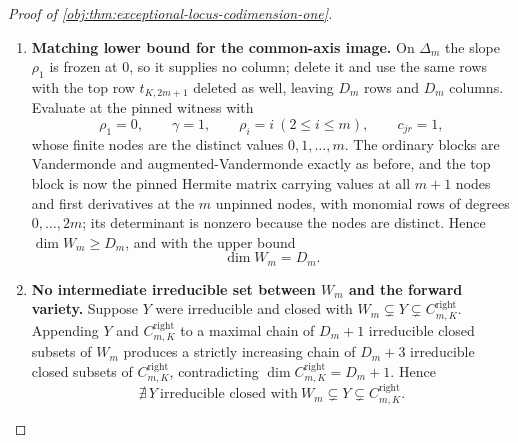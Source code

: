 \begin{proof}[Proof of \cref{obj:thm:exceptional-locus-codimension-one}]
\begin{enumerate}
\begin{itemize}
\end{itemize}
The product of the diagonal determinants is nonzero, so the selected minor is a nonzero polynomial and
\[
\dim C^{\mathrm{right}}_{m,K}\ge D_m+1 .
\]
With the upper bound of the previous step, \(\dim C^{\mathrm{right}}_{m,K}=D_m+1\).

\item \textbf{Matching lower bound for the common-axis image.}  On \(\Delta_m\) the slope \(\rho_1\) is frozen at \(0\), so it supplies no column; delete it and use the same rows with the top row \(t_{K,2m+1}\) deleted as well, leaving \(D_m\) rows and \(D_m\) columns.  Evaluate at the pinned witness with
\[
\rho_1=0,\qquad \gamma=1,\qquad \rho_i=i\ (2\le i\le m),\qquad c_{jr}=1 ,
\]
whose finite nodes are the distinct values \(0,1,\ldots,m\).  The ordinary blocks are Vandermonde and augmented-Vandermonde exactly as before, and the top block is now the pinned Hermite matrix carrying values at all \(m+1\) nodes and first derivatives at the \(m\) unpinned nodes, with monomial rows of degrees \(0,\ldots,2m\); its determinant is nonzero because the nodes are distinct.  Hence \(\dim W_m\ge D_m\), and with the upper bound
\[
\dim W_m=D_m .
\]

\item \textbf{No intermediate irreducible set between \(W_m\) and the forward variety.}  Suppose \(Y\) were irreducible and closed with \(W_m\subsetneq Y\subsetneq C^{\mathrm{right}}_{m,K}\).  Appending \(Y\) and \(C^{\mathrm{right}}_{m,K}\) to a maximal chain of \(D_m+1\) irreducible closed subsets of \(W_m\) produces a strictly increasing chain of \(D_m+3\) irreducible closed subsets of \(C^{\mathrm{right}}_{m,K}\), contradicting \(\dim C^{\mathrm{right}}_{m,K}=D_m+1\).  Hence
\[
\nexists\,Y\ \text{irreducible closed with}\ W_m\subsetneq Y\subsetneq C^{\mathrm{right}}_{m,K}.
\]


\end{enumerate}
\end{proof}
